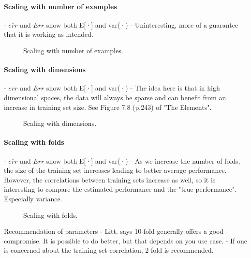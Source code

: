 \paragraph{Scaling with number of examples}
   - $\overline{err}$ and $Err$
      show both E[·] and var(·)
   - Uninteresting, more of a guarantee that it is working as intended.
\begin{center}
\begin{figure}
   \missingfigure{}
   \label{fig:test1}
   \caption{Scaling with number of examples.}
\end{figure}
\end{center}

\paragraph{Scaling with dimensions}
   - $\overline{err}$ and $Err$
      show both E[·] and var(·)
   - The idea here is that in high dimensional spaces, the data will always be sparse and can benefit from an increase in training set size.  See Figure 7.8 (p.243) of "The Elements".
\begin{center}
\begin{figure}
   \missingfigure{}
   \label{fig:test2}
   \caption{Scaling with dimensions.}
\end{figure}
\end{center}

\paragraph{Scaling with folds}
   - $\overline{err}$ and $Err$
      show both E[·] and var(·)
   - As we increase the number of folds, the size of the training set increases leading to better average performance. However, the correlations between training sets increase as well, so it is interesting to compare the estimated performance and the "true performance". Especially variance.
\begin{center}
\begin{figure}
   \missingfigure{}
   \label{fig:test3}
   \caption{Scaling with folds.}
\end{figure}
\end{center}

Recommendation of parameters
   - Litt. says 10-fold generally offers a good compromise. It is possible to do better, but that depends on you use case.
   - If one is concerned about the training set correlation, 2-fold is recommended.

